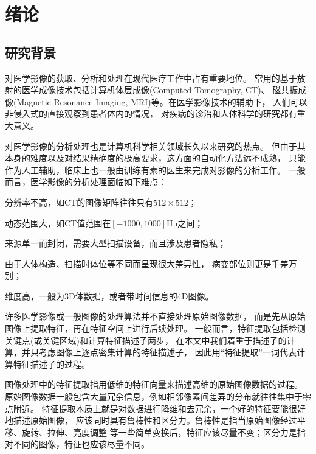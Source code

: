 
\chapter{绪论\label{chap:intro}}

\section{研究背景}
对医学影像的获取、分析和处理在现代医疗工作中占有重要地位。
常用的基于放射的医学成像技术包括计算机体层成像(Computed Tomography, CT)、
磁共振成像(Magnetic Resonance Imaging, MRI)等。在医学影像技术的辅助下，
人们可以非侵入式的直接观察到患者体内的情况，
对疾病的诊治和人体科学的研究都有重大意义。

对医学影像的分析处理也是计算机科学相关领域长久以来研究的热点。
但由于其本身的难度以及对结果精确度的极高要求，这方面的自动化方法远不成熟，
只能作为人工辅助，临床上也一般由训练有素的医生来完成对影像的分析工作。
一般而言，医学影像的分析处理面临如下难点：
\begin{inparaenum}[(1)]
    \item 分辨率不高，如CT的图像矩阵往往只有$512\times 512$\cite{medimging2}；
    \item 动态范围大，如CT值范围在$[-1000,1000]$Hu之间\cite{medimging2}；
    \item 来源单一而封闭，需要大型扫描设备，而且涉及患者隐私；
    \item 由于人体构造、扫描时体位等不同而呈现很大差异性，
        病变部位则更是千差万别；
    \item 维度高，一般为3D体数据，或者带时间信息的4D图像。
\end{inparaenum}

许多医学影像或一般图像的处理算法并不直接处理原始图像数据，
而是先从原始图像上提取特征，再在特征空间上进行后续处理。
一般而言，特征提取包括检测关键点(或关键区域)和计算特征描述子两步，
在本文中我们着重于描述子的计算，并只考虑图像上逐点密集计算的特征描述子，
因此用``特征提取''一词代表计算特征描述子的过程。

图像处理中的特征提取指用低维的特征向量来描述高维的原始图像数据的过程。
原始图像数据一般包含大量冗余信息，例如相邻像素间差异的分布就往往集中于零点附近。
特征提取本质上就是对数据进行降维和去冗余，一个好的特征要能很好地描述原始图像，
应该同时具有鲁棒性和区分力。鲁棒性是指当原始图像经过平移、旋转、拉伸、亮度调整
等一些简单变换后，特征应该尽量不变；区分力是指对不同的图像，特征也应该尽量不同。

